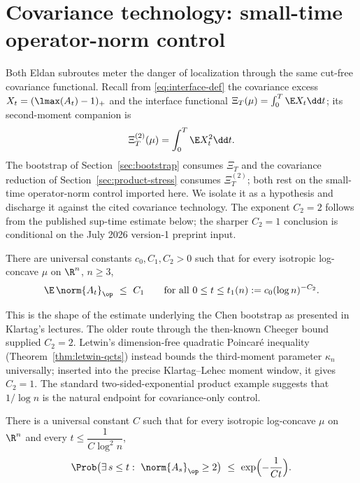 \documentclass[../../main.tex]{subfiles}
\begin{document}
\section{Covariance technology: small-time operator-norm control}
\label{sec:covariance-tech}

Both Eldan subroutes meter the danger of localization through the same cut-free covariance
functional.
Recall from \eqref{eq:interface-def} the covariance excess $X_t=(\lmax(A_t)-1)_+$ and the
interface functional $\Xi_T(\mu)=\int_0^T\E X_t\dd t$; its second-moment companion is
\begin{equation}\label{eq:Xi2-def}
  \Xi^{(2)}_T(\mu)=\int_0^T\E X_t^2\dd t .
\end{equation}
The bootstrap of Section~\ref{sec:bootstrap} consumes $\Xi_T$ and the covariance reduction of
Section~\ref{sec:product-stress} consumes $\Xi^{(2)}_T$; both rest on the small-time
operator-norm control imported here. We isolate it as a hypothesis and discharge it against
the cited covariance technology. The exponent $C_2=2$ follows from the published sup-time
estimate below; the sharper $C_2=1$ conclusion is conditional on the July 2026 version-1
preprint input.

\begin{hypothesis}
\label{hyp:KI}
There are universal constants $c_0,C_1,C_2>0$ such that for every isotropic log-concave $\mu$ on
$\R^n$, $n\ge3$,
\[
  \E\,\norm{A_t}_\op\ \le\ C_1
  \qquad\text{for all }0\le t\le t_1(n):=c_0(\log n)^{-C_2}.
\]
\end{hypothesis}

\noindent
This is the shape of the estimate underlying the Chen bootstrap as presented in Klartag's
lectures. The older route through the then-known Cheeger bound supplied $C_2=2$. Letwin's
dimension-free quadratic Poincar\'e inequality (Theorem~\ref{thm:letwin-qcts}) instead bounds the
third-moment parameter $\kappa_n$ universally; inserted into the precise Klartag--Lehec moment
window, it gives $C_2=1$. The standard two-sided-exponential product example suggests that
$1/\log n$ is the natural endpoint for covariance-only control.

\begin{theorem}
\label{thm:KL-window}
There is a universal constant $C$ such that for every isotropic log-concave $\mu$ on $\R^n$
and every $t\le\dfrac1{C\log^2n}$,
\[
  \Prob\bigl(\exists\,s\le t:\ \norm{A_s}_\op\ge2\bigr)\ \le\ \exp\Bigl(-\frac1{Ct}\Bigr).
\]
\end{theorem}
\end{document}
